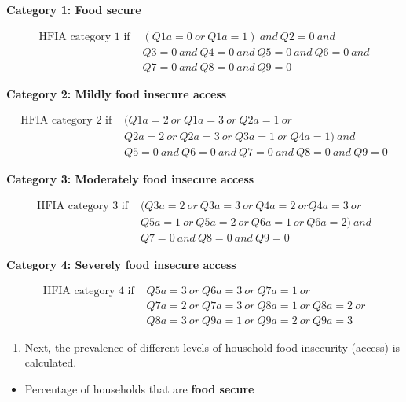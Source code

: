 \documentclass[12pt,]{book}
\providecommand{\tightlist}{%
  \setlength{\itemsep}{0pt}\setlength{\parskip}{0pt}}
\theoremstyle{definition}
\theoremstyle{definition}
\theoremstyle{definition}
\theoremstyle{remark}
\begin{document}
\textbf{Category 1: Food secure}

\[\begin{aligned} 
\text{HFIA category 1 if } & (Q1a = 0 ~ or ~ Q1a = 1) ~ and ~ Q2 = 0 ~ and \\
& Q3 = 0 ~ and ~ Q4 = 0 ~ and ~ Q5 = 0 ~ and ~ Q6 = 0 ~ and \\
& Q7 = 0 ~ and ~ Q8 = 0 ~ and ~ Q9 = 0 
\end{aligned}\]

\textbf{Category 2: Mildly food insecure access}

\[\begin{aligned} 
\text{HFIA category 2 if } & (Q1a = 2 ~ or ~ Q1a = 3 ~ or ~ Q2a = 1 ~ or \\
& Q2a = 2 ~ or ~ Q2a = 3 ~ or ~ Q3a = 1 ~ or ~ Q4a = 1) ~ and \\
& Q5 = 0 ~ and ~ Q6 = 0 ~ and ~ Q7 = 0 ~ and ~ Q8 = 0 ~ and ~ Q9 = 0 
\end{aligned}\]

\textbf{Category 3: Moderately food insecure access}

\[\begin{aligned}
\text{HFIA category 3 if } & (Q3a = 2 ~ or ~ Q3a = 3 ~ or ~ Q4a = 2 ~ or Q4a = 3 ~ or \\ 
& Q5a = 1 ~ or ~ Q5a = 2 ~ or ~ Q6a = 1 ~ or ~ Q6a = 2) ~ and \\ 
& Q7 = 0 ~ and ~ Q8 = 0 ~ and ~ Q9 = 0
\end{aligned}\]

\textbf{Category 4: Severely food insecure access}

\[\begin{aligned}
\text{HFIA category 4 if } & Q5a = 3 ~ or ~ Q6a = 3 ~ or ~ Q7a = 1 ~ or \\
& Q7a = 2 ~ or ~ Q7a = 3 ~ or ~ Q8a = 1 ~ or ~ Q8a = 2 ~ or \\
& Q8a = 3 ~ or ~ Q9a = 1 ~ or ~ Q9a = 2 ~ or ~ Q9a = 3
\end{aligned}\]

\begin{enumerate}
\def\labelenumi{\arabic{enumi}.}
\setcounter{enumi}{2}
\tightlist
\item
  Next, the prevalence of different levels of household food insecurity
  (access) is calculated.
\end{enumerate}

\begin{itemize}
\tightlist
\item
  Percentage of households that are \textbf{food secure}
\end{itemize}
\end{document}
